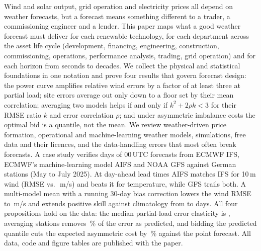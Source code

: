 Wind and solar output, grid operation and electricity prices all depend on weather forecasts, but a forecast means something different to a trader, a commissioning engineer and a lender. This paper maps what a good weather forecast must deliver for each renewable technology, for each department across the asset life cycle (development, financing, engineering, construction, commissioning, operations, performance analysis, trading, grid operation) and for each horizon from seconds to decades. We collect the physical and statistical foundations in one notation and prove four results that govern forecast design: the power curve amplifies relative wind errors by a factor of at least three at partial load; site errors average out only down to a floor set by their mean correlation; averaging two models helps if and only if $k^2+2\rho k<3$ for their RMSE ratio $k$ and error correlation $\rho$; and under asymmetric imbalance costs the optimal bid is a quantile, not the mean. We review weather-driven price formation, operational and machine-learning weather models, simulations, free data and their licences, and the data-handling errors that most often break forecasts. A case study verifies \valNumRuns{} days of 00\,UTC forecasts from ECMWF IFS, ECMWF's machine-learning model AIFS and NOAA GFS against \valNumStations{} German stations (May to July 2025). At day-ahead lead times AIFS matches IFS for 10\,m wind (RMSE \valWindAifsRmseDayAhead{} vs.\ \valWindIfsRmseDayAhead\,m/s) and beats it for temperature, while GFS trails both. A multi-model mean with a running 30-day bias correction lowers the wind RMSE to \valWindMmmBcRmseDayAhead\,m/s and extends positive skill against climatology from \valWindIfsSkillZeroDays{} to \valWindMmmBcSkillZeroDays{} days. All four propositions hold on the data: the median partial-load error elasticity is \valElasticityMedian, averaging \valNumStations{} stations removes \valAggRelRmseAllPct\,\% of the error as predicted, and bidding the predicted quantile cuts the expected asymmetric cost by \valCostSavingPct\,\% against the point forecast. All data, code and figure tables are published with the paper.
